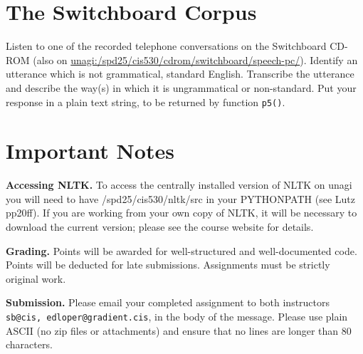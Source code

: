 \documentclass{cis530}
\begin{document}
\section{The Switchboard Corpus}

Listen to one of the recorded telephone conversations on the
Switchboard CD-ROM (also on
\url{unagi:/spd25/cis530/cdrom/switchboard/speech-pc/}).  Identify an
utterance which is not grammatical, standard English.  Transcribe the
utterance and describe the way(s) in which it is ungrammatical or
non-standard.  Put your response in a plain text string, to be returned
by function \texttt{p5()}.

\section{Important Notes}

{\bf Accessing NLTK.}
To access the centrally installed version of NLTK on
unagi you will need to have /spd25/cis530/nltk/src in your
PYTHONPATH (see Lutz pp20ff).  If you are working from your own
copy of NLTK, it will be necessary to download the current version;
please see the course website for details.

{\bf Grading.}
Points will be awarded for well-structured and well-documented code.
Points will be deducted for late submissions.
Assignments must be strictly original work.

{\bf Submission.}
Please email your completed assignment to both instructors
\texttt{sb@cis, edloper@gradient.cis}, in the body of the message.
Please use plain ASCII (no zip files or attachments) and ensure
that no lines are longer than 80 characters.
\end{document}
